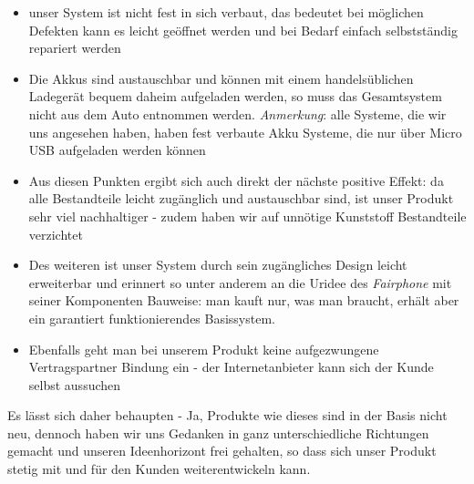 \begin{itemize}
	\item unser System ist nicht fest in sich verbaut, das bedeutet bei möglichen Defekten kann es leicht geöffnet werden und bei Bedarf einfach selbstständig repariert werden
	\item Die Akkus sind austauschbar und können mit einem handelsüblichen Ladegerät bequem daheim aufgeladen werden, so muss das Gesamtsystem nicht aus dem Auto entnommen werden. \textit{Anmerkung}: alle Systeme, die wir uns angesehen haben, haben fest verbaute Akku Systeme, die nur über Micro USB aufgeladen werden können
	\item Aus diesen Punkten ergibt sich auch direkt der nächste positive Effekt: da alle Bestandteile leicht zugänglich und austauschbar sind, ist unser Produkt sehr viel nachhaltiger - zudem haben wir auf unnötige Kunststoff Bestandteile verzichtet
	\item Des weiteren ist unser System durch sein zugängliches Design leicht erweiterbar und erinnert so unter anderem an die Uridee des \textit{Fairphone} mit seiner Komponenten Bauweise: man kauft nur, was man braucht, erhält aber  ein garantiert funktionierendes Basissystem.
	\item Ebenfalls geht man bei unserem Produkt keine aufgezwungene Vertragspartner Bindung ein - der Internetanbieter kann sich der Kunde selbst aussuchen
\end{itemize}
Es lässt sich daher behaupten - Ja, Produkte wie dieses sind in der Basis nicht neu, dennoch haben wir uns Gedanken in ganz unterschiedliche Richtungen gemacht und unseren Ideenhorizont frei gehalten, so dass sich unser Produkt stetig mit und für den Kunden weiterentwickeln kann.
